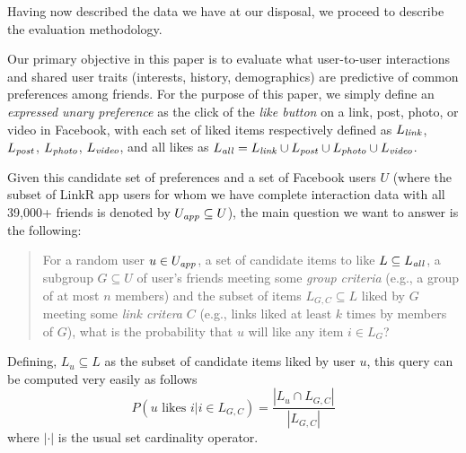 \label{sec:methodology}

Having now described the data we have at our disposal, we proceed
to describe the evaluation methodology.


Our primary objective in this paper is to evaluate what user-to-user
interactions and shared user traits (interests, history, demographics)
are predictive of common preferences among friends.  For the purpose
of this paper, we simply define an \emph{expressed unary preference}
as the click of the \emph{like button} on a link, post, photo, or
video in Facebook, with each set of liked items respectively defined as
$L_{\mathit{link}}$, $L_{\mathit{post}}$, $L_{\mathit{photo}}$, $L_{\mathit{video}}$, and all likes as $L_{\mathit{all}}
= L_{\mathit{link}} \cup L_{\mathit{post}} \cup L_{\mathit{photo}} \cup L_{\mathit{video}}$.

Given this candidate set of preferences and a set of Facebook users
$U$ (where the subset of LinkR app users for whom 
we have complete interaction data with all 39,000+ friends
is denoted by $U_{\mathit{app}} \subseteq U$), the main
question we want to answer is the following: 

\begin{quote}
For a random user $u \in U_{\mathit{app}}$, a set of candidate items to like $L
\subseteq L_{\mathit{all}}$, a subgroup $G \subseteq U$ of user's friends
meeting some \emph{group criteria} (e.g., a group of at most $n$
members) and the subset of items $L_{G,C} \subseteq L$ liked by $G$
meeting some \emph{link critera} $C$ (e.g., links liked at least $k$
times by members of $G$), what is the probability that $u$ will like
any item $i \in L_G$?
\end{quote}

Defining, $L_u \subseteq L$ as the subset of candidate items liked
by user $u$, this query can be computed very easily as follows
\begin{equation}
P(u \mbox{ likes } i | i \in L_{G,C}) = \frac{|L_u \cap L_{G,C}|}{|L_{G,C}|}
\end{equation}
where $|\cdot|$ is the usual set cardinality operator.

